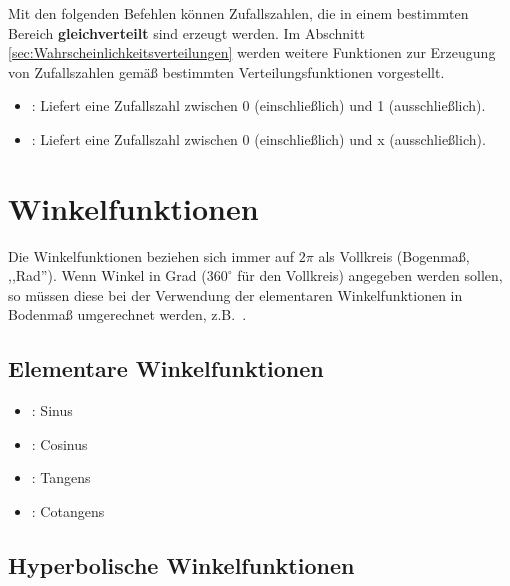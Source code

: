 Mit den folgenden Befehlen können Zufallszahlen, die in einem bestimmten
Bereich \textbf{gleichverteilt} sind erzeugt werden. Im Abschnitt
\ref{sec:Wahrscheinlichkeitsverteilungen} werden weitere Funktionen zur
Erzeugung von Zufallszahlen gemäß bestimmten Verteilungsfunktionen vorgestellt.

\begin{itemize}

\item
{}:
Liefert eine Zufallszahl zwischen 0 (einschließlich) und 1 (ausschließlich).

\item
{}:
Liefert eine Zufallszahl zwischen 0 (einschließlich) und x (ausschließlich).

\end{itemize}





\chapter{Winkelfunktionen}\label{sec:Winkelfunktionen}

Die Winkelfunktionen beziehen sich immer auf $2\pi$ als Vollkreis (Bogenmaß, ,,Rad'').
Wenn Winkel in Grad ($360^\circ$ für den Vollkreis) angegeben werden sollen, so müssen
diese bei der Verwendung der elementaren Winkelfunktionen in Bodenmaß umgerechnet werden,
z.B.\ .



\section{Elementare Winkelfunktionen}

\begin{itemize}

\item
{}:
Sinus

\item
{}:
Cosinus

\item
{}:
Tangens

\item
{}:
Cotangens

\end{itemize}



\section{Hyperbolische Winkelfunktionen}

